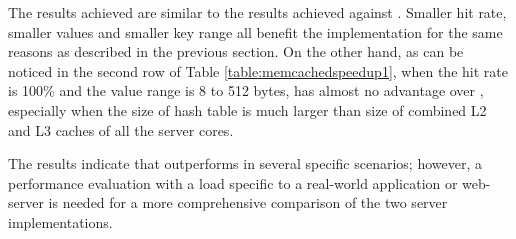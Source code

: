 The results achieved are similar to the results achieved against \lockserver{}. Smaller hit rate, smaller values and smaller key range all benefit the
\cpserver{} implementation for the same reasons as described in the previous section. On the other hand, as can be noticed in the second row of Table 
\ref{table:memcachedspeedup1}, when the hit rate is 100\% and the value range is 8 to 512 bytes, \cpserver{} has almost no advantage over \memcached{},
especially when the size of hash table is much larger than size of combined L2 and L3 caches of all the server cores.

The results indicate that \cpserver{} outperforms \memcached{} in several specific scenarios; however, a performance evaluation with a load specific to a 
real-world application or web-server is needed for a more comprehensive comparison of the two server implementations. 

